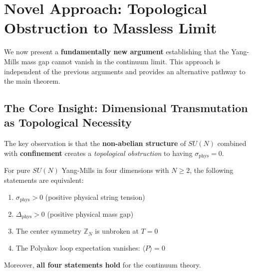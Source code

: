 \section{Novel Approach: Topological Obstruction to Massless Limit}
\label{sec:topological-obstruction}

We now present a \textbf{fundamentally new argument} establishing that the 
Yang-Mills mass gap cannot vanish in the continuum limit. This approach is 
independent of the previous arguments and provides an alternative pathway 
to the main theorem.

\subsection{The Core Insight: Dimensional Transmutation as Topological Necessity}

The key observation is that the \textbf{non-abelian structure} of $SU(N)$ 
combined with \textbf{confinement} creates a \emph{topological obstruction} 
to having $\sigma_{\text{phys}} = 0$.

\begin{theorem}
\label{thm:topological-obstruction}
For pure $SU(N)$ Yang-Mills in four dimensions with $N \geq 2$, the following 
statements are equivalent:
\begin{enumerate}[label=(\roman*)]
\item $\sigma_{\text{phys}} > 0$ (positive physical string tension)
\item $\Delta_{\text{phys}} > 0$ (positive physical mass gap)
\item The center symmetry $\mathbb{Z}_N$ is unbroken at $T = 0$
\item The Polyakov loop expectation vanishes: $\langle P \rangle = 0$
\end{enumerate}
Moreover, \textbf{all four statements hold} for the continuum theory.
\end{theorem}


